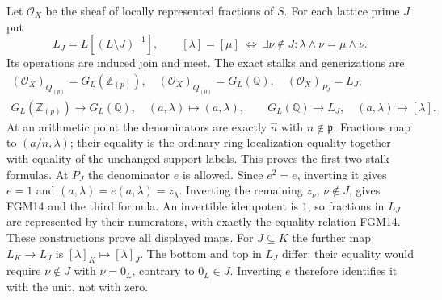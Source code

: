 Let $\mathcal O_X$ be the sheaf of locally represented fractions of
$S$. For each lattice prime $J$ put
\begin{equation}\tag{FGM14}
 L_J=L[(L\setminus J)^{-1}],\qquad
 [\lambda]=[\mu]\ \Longleftrightarrow\
 \exists\nu\notin J:\lambda\wedge\nu=\mu\wedge\nu.
\end{equation}
Its operations are induced join and meet. The exact stalks and
generizations are
\begin{equation}\tag{FGM15}
 \begin{gathered}
 (\mathcal O_X)_{Q_{(p)}}=G_L(\mathbb Z_{(p)}),\quad
 (\mathcal O_X)_{Q_{(0)}}=G_L(\mathbb Q),\quad
 (\mathcal O_X)_{P_J}=L_J,\\
 G_L(\mathbb Z_{(p)})\longrightarrow G_L(\mathbb Q),\quad
 (a,\lambda)\longmapsto(a,\lambda),\qquad
 G_L(\mathbb Q)\longrightarrow L_J,\quad(a,\lambda)\longmapsto[\lambda].
 \end{gathered}
\end{equation}
At an arithmetic point the denominators are exactly
$\widehat n$ with $n\notin\mathfrak p$. Fractions map to
$(a/n,\lambda)$; their equality is the ordinary ring localization
equality together with equality of the unchanged support labels.
This proves the first two stalk formulas. At $P_J$ the denominator
$e$ is allowed. Since $e^2=e$, inverting it gives $e=1$ and
$(a,\lambda)=e(a,\lambda)=z_\lambda$. Inverting the remaining
$z_\nu$, $\nu\notin J$, gives FGM14 and the third formula.
An invertible idempotent is $1$, so fractions in $L_J$ are represented
by their numerators, with exactly the equality relation FGM14.
These constructions prove all displayed maps. For $J\subseteq K$
the further map $L_K\to L_J$ is $[\lambda]_K\mapsto[\lambda]_J$.
The bottom and top in $L_J$ differ: their equality would require
$\nu\notin J$ with $\nu=0_L$, contrary to $0_L\in J$.
Inverting $e$ therefore identifies it with the unit, not with zero.

